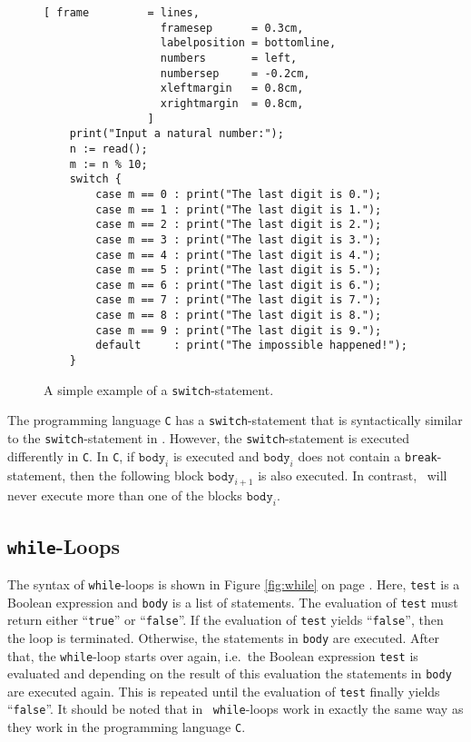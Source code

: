 \begin{figure}[!ht]
\centering
\begin{Verbatim}[ frame         = lines, 
                  framesep      = 0.3cm, 
                  labelposition = bottomline,
                  numbers       = left,
                  numbersep     = -0.2cm,
                  xleftmargin   = 0.8cm,
                  xrightmargin  = 0.8cm,
                ]
    print("Input a natural number:");
    n := read();
    m := n % 10;
    switch {
        case m == 0 : print("The last digit is 0.");
        case m == 1 : print("The last digit is 1.");
        case m == 2 : print("The last digit is 2.");
        case m == 3 : print("The last digit is 3.");
        case m == 4 : print("The last digit is 4.");
        case m == 5 : print("The last digit is 5.");
        case m == 6 : print("The last digit is 6.");
        case m == 7 : print("The last digit is 7.");
        case m == 8 : print("The last digit is 8.");
        case m == 9 : print("The last digit is 9.");
        default     : print("The impossible happened!");
    }
\end{Verbatim}
\vspace*{-0.3cm}
\caption{A simple example of a \texttt{switch}-statement.}
\label{fig:switch.stlx}
\end{figure}
\remarkEng
The programming language \texttt{C} has a \texttt{switch}-statement that is syntactically similar to the
\texttt{switch}-statement in \setlx.  However, the \texttt{switch}-statement is executed
\colorbox{amethyst}{differently} in \texttt{C}.  In \texttt{C}, if $\texttt{body}_i$ is executed and $\texttt{body}_i$ does not contain a
\texttt{break}-statement, then the following block $\texttt{body}_{i+1}$ is also executed.  In contrast,
\setlx\ will \colorbox{amethyst}{never} execute more than one of the blocks $\texttt{body}_i$.


\subsection{\texttt{while}-Loops}
The syntax of  \texttt{while}-loops is shown in Figure \ref{fig:while} on page
\pageref{fig:while}.  Here,  \texttt{test} is a Boolean expression and \texttt{body} is a list of statements.  
The evaluation of \texttt{test} must
return either  ``\texttt{true}'' or ``\texttt{false}''.
If the evaluation of \texttt{test} yields  ``\texttt{false}'', then the loop is terminated.
Otherwise, the statements in \texttt{body} are executed.  After that, the \texttt{while}-loop starts over
again, i.e.~the Boolean expression \texttt{test} is evaluated and depending on the result of this evaluation
the statements in  \texttt{body} are executed again.  This is repeated until the evaluation of  \texttt{test}
finally yields  ``\texttt{false}''.  It should be noted that in \setlx\ \texttt{while}-loops work in exactly
the same way as they work in the programming language \texttt{C}.

